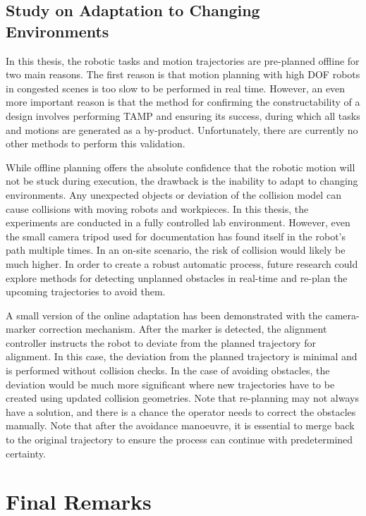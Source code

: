 \subsection{Study on Adaptation to Changing Environments}
\label{subsection:study_on_adaptation_to_changing_environments}

In this thesis, the robotic tasks and motion trajectories are pre-planned offline for two main reasons. The first reason is that motion planning with high DOF robots in congested scenes is too slow to be performed in real time. However, an even more important reason is that the method for confirming the constructability of a design involves performing TAMP and ensuring its success, during which all tasks and motions are generated as a by-product. Unfortunately, there are currently no other methods to perform this validation. 

While offline planning offers the absolute confidence that the robotic motion will not be stuck during execution, the drawback is the inability to adapt to changing environments. Any unexpected objects or deviation of the collision model can cause collisions with moving robots and workpieces. In this thesis, the experiments are conducted in a fully controlled lab environment. However, even the small camera tripod used for documentation has found itself in the robot's path multiple times. In an on-site scenario, the risk of collision would likely be much higher. In order to create a robust automatic process, future research could explore methods for detecting unplanned obstacles in real-time and re-plan the upcoming trajectories to avoid them.

A small version of the online adaptation has been demonstrated with the camera-marker correction mechanism. After the marker is detected, the alignment controller instructs the robot to deviate from the planned trajectory for alignment. In this case, the deviation from the planned trajectory is minimal and is performed without collision checks. In the case of avoiding obstacles, the deviation would be much more significant where new trajectories have to be created using updated collision geometries. Note that re-planning may not always have a solution, and there is a chance the operator needs to correct the obstacles manually. Note that after the avoidance manoeuvre, it is essential to merge back to the original trajectory to ensure the process can continue with predetermined certainty.

\section{Final Remarks}
\label{section:final_remarks}

